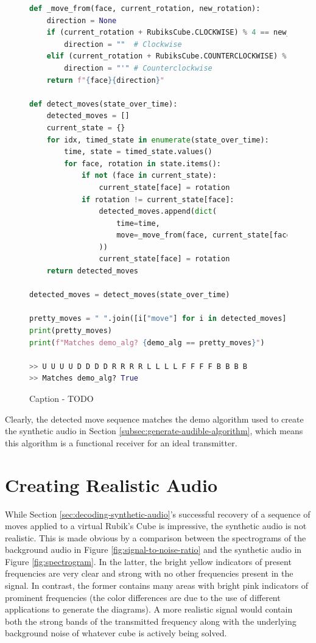 \begin{figure}[h]
\begin{lstlisting}[language=Python]
def _move_from(face, current_rotation, new_rotation):
    direction = None
    if (current_rotation + RubiksCube.CLOCKWISE) % 4 == new_rotation:
        direction = ""  # Clockwise
    elif (current_rotation + RubiksCube.COUNTERCLOCKWISE) % 4 == new_rotation:
        direction = "'" # Counterclockwise
    return f"{face}{direction}"

def detect_moves(state_over_time):
    detected_moves = []
    current_state = {}
    for idx, timed_state in enumerate(state_over_time):
        time, state = timed_state.values()
        for face, rotation in state.items():
            if not (face in current_state):
                current_state[face] = rotation
            if rotation != current_state[face]:
                detected_moves.append(dict(
                    time=time,
                    move=_move_from(face, current_state[face], rotation)
                ))
                current_state[face] = rotation
    return detected_moves

detected_moves = detect_moves(state_over_time)

pretty_moves = " ".join([i["move"] for i in detected_moves])
print(pretty_moves)   
print(f"Matches demo_alg? {demo_alg == pretty_moves}") 

>> U U U U D D D D R R R R L L L L F F F F B B B B
>> Matches demo_alg? True
\end{lstlisting}
\caption{Caption - TODO}
\label{fig:todo}
\end{figure}

Clearly, the detected move sequence matches the demo algorithm used to create the synthetic audio in Section \ref{subsec:generate-audible-algorithm}, which means this algorithm is a functional receiver for an ideal transmitter.


\newpage
\section{Creating Realistic Audio}
\label{sec:adding-realistic-noise}
While Section \ref{sec:decoding-synthetic-audio}'s successful recovery of a sequence of moves applied to a virtual Rubik's Cube is impressive, the synthetic audio is not realistic.
This is made obvious by a comparison between the spectrograms of the background audio in Figure \ref{fig:signal-to-noise-ratio} and the synthetic audio in Figure \ref{fig:spectrogram}.
In the latter, the bright yellow indicators of present frequencies are very clear and strong with no other frequencies present in the signal.
In contrast, the former contains many areas with bright pink indicators of prominent frequencies (the color differences are due to the use of different applications to generate the diagrams).
A more realistic signal would contain both the strong bands of the transmitted frequency along with the underlying background noise of whatever cube is actively being solved.


